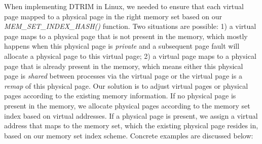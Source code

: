 \vspace{2mm}
 When
implementing DTRIM in Linux, we needed to ensure that each virtual
page mapped to a physical page in the right memory set based on our
{\it MEM\_SET\_INDEX\_HASH()} function.  Two situations are possible:
1) a virtual page maps to a physical page that is not present in the
memory, which mostly happens when this physical page is
\textit{private} and a subsequent page fault will allocate a physical
page to this virtual page; 2) a virtual page maps to a physical page
that is already present in the memory, which means either this
physical page is \textit{shared} between processes via the virtual
page or the virtual page is a \textit{remap} of this physical page.
Our solution is to adjust virtual pages or physical pages according to
the existing memory information. If no physical page is present in the
memory, we allocate physical pages according to the memory set index
based on virtual addresses. If a physical page is present, we assign a
virtual address that maps to the memory set, which the existing
physical page resides in, based on our memory set index
scheme. Concrete examples are discussed below:

